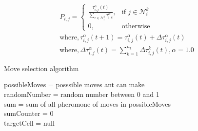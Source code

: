 \documentclass[hidelinks,english,conference]{IEEEtran}
\begin{document}
  \begin{align}\label{moveProbabilityEquation}
  P_{i,j}= 
  \begin{cases}
  \frac{\tau_{i,j}^{\alpha}(t)}{\sum_{e\in \mathcal{N}_{i}^{k}}\tau_{i,e}^{\alpha}},& \text{if } j \in \mathcal{N}_{i}^{k}\\
  0,              & \text{otherwise}
  \end{cases}\\
  \text{where}, \tau_{i,j}^{\alpha}(t+1) = \tau_{i,j}^{\alpha}(t) + \Delta\tau_{i,j}^{\alpha}(t)\\
  \text{where},  \Delta\tau_{i,j}^{\alpha}(t) = \sum_{k=1}^{n_{k}}\Delta\tau_{i,j}^{k}(t), \alpha=1.0
  \end{align}

    \begin{algorithm}
        \SetAlgoLined
        \caption{Move selection algorithm}\label{moveChoiceAlgorithm}
        possibleMoves = posssible moves ant can make\\
        randomNumber = random number between 0 and 1\\
        sum = sum of all pheromone of moves in possibleMoves\\
        sumCounter = 0\\
        targetCell = null\\
    \end{algorithm}
    
\end{document}
